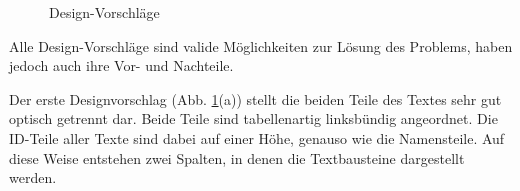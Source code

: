 \begin{figure}[H] 
	\centering
	\hspace{1.0em}
	\hspace{1.0em}
	\caption{Design-Vorschläge}
	\label{fig:liste2}
\end{figure}

Alle Design-Vorschläge sind valide Möglichkeiten zur Lösung des Problems, haben jedoch auch ihre Vor- und Nachteile.

Der erste Designvorschlag (Abb. \ref{fig:liste2}(a)) stellt die beiden Teile des Textes sehr gut optisch getrennt dar. Beide Teile sind tabellenartig linksbündig angeordnet. Die ID-Teile aller Texte sind dabei auf einer Höhe, genauso wie die Namensteile. Auf diese Weise entstehen zwei Spalten, in denen die Textbausteine dargestellt werden.

